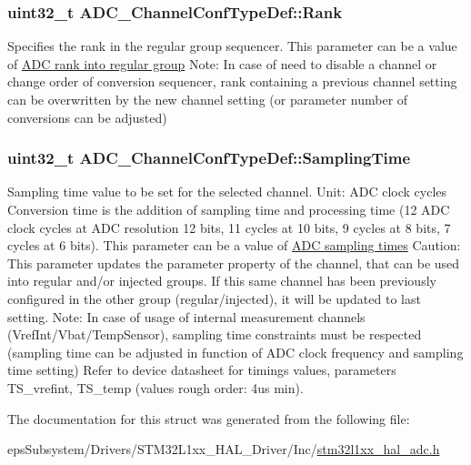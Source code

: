 {\subsubsection[{Rank}]{\setlength{\rightskip}{0pt plus 5cm}uint32\-\_\-t A\-D\-C\-\_\-\-Channel\-Conf\-Type\-Def\-::\-Rank}}\label{struct_a_d_c___channel_conf_type_def_a106e52a928aefb7778802bac0b75cf2d}
Specifies the rank in the regular group sequencer. This parameter can be a value of \hyperlink{group___a_d_c__regular__rank}{A\-D\-C rank into regular group} Note\-: In case of need to disable a channel or change order of conversion sequencer, rank containing a previous channel setting can be overwritten by the new channel setting (or parameter number of conversions can be adjusted) \hypertarget{struct_a_d_c___channel_conf_type_def_ae9486a657d515b87e2c2853db59afaaa}{
\subsubsection[{Sampling\-Time}]{\setlength{\rightskip}{0pt plus 5cm}uint32\-\_\-t A\-D\-C\-\_\-\-Channel\-Conf\-Type\-Def\-::\-Sampling\-Time}}\label{struct_a_d_c___channel_conf_type_def_ae9486a657d515b87e2c2853db59afaaa}
Sampling time value to be set for the selected channel. Unit\-: A\-D\-C clock cycles Conversion time is the addition of sampling time and processing time (12 A\-D\-C clock cycles at A\-D\-C resolution 12 bits, 11 cycles at 10 bits, 9 cycles at 8 bits, 7 cycles at 6 bits). This parameter can be a value of \hyperlink{group___a_d_c__sampling__times}{A\-D\-C sampling times} Caution\-: This parameter updates the parameter property of the channel, that can be used into regular and/or injected groups. If this same channel has been previously configured in the other group (regular/injected), it will be updated to last setting. Note\-: In case of usage of internal measurement channels (Vref\-Int/\-Vbat/\-Temp\-Sensor), sampling time constraints must be respected (sampling time can be adjusted in function of A\-D\-C clock frequency and sampling time setting) Refer to device datasheet for timings values, parameters T\-S\-\_\-vrefint, T\-S\-\_\-temp (values rough order\-: 4us min). 

The documentation for this struct was generated from the following file\-:\begin{DoxyCompactItemize}
\item 
eps\-Subsystem/\-Drivers/\-S\-T\-M32\-L1xx\-\_\-\-H\-A\-L\-\_\-\-Driver/\-Inc/\hyperlink{stm32l1xx__hal__adc_8h}{stm32l1xx\-\_\-hal\-\_\-adc.\-h}\end{DoxyCompactItemize}
